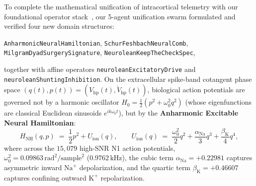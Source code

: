 \documentclass[11pt,letterpaper]{article}
\newcommand{\lean}[1]{\nolinkurl{#1}}
\theoremstyle{definition}
\begin{document}
To complete the mathematical unification of intracortical telemetry with our foundational operator stack~\cite{solidsf_pixelean2026,solidsf_milgram2026,solidsf_reality_comb2026,solidsf_halting2026,solidsf_doomed2026,solidsf_lecun2026}, our 5-agent unification swarm formulated and verified four new domain structures:
\begin{center}
\footnotesize
\lean{AnharmonicNeuralHamiltonian}, \quad \lean{SchurFeshbachNeuralComb},\\
\lean{MilgramDyadSurgerySignature}, \quad \lean{NeuroleanKeepTheCheckSpec},
\end{center}
together with affine operators \lean{neuroleanExcitatoryDrive} and \lean{neuroleanShuntingInhibition}. On the extracellular spike-band cotangent phase space $(q(t), p(t)) = (V_{\mathrm{hp}}(t), \dot{V}_{\mathrm{hp}}(t))$, biological action potentials are governed not by a harmonic oscillator $H_0 = \frac{1}{2}(p^2 + \omega_0^2 q^2)$ (whose eigenfunctions are classical Euclidean sinusoids $e^{ik\omega_0 t}$), but by the \textbf{Anharmonic Excitable Neural Hamiltonian}:
\begin{equation}\label{eq:anharmonic_nhf}
  H_{\mathrm{NH}}(q, p) \;=\; \frac{1}{2}p^2 + U_{\mathrm{ion}}(q), \qquad
  U_{\mathrm{ion}}(q) \;=\; \frac{\omega_0^2}{2}q^2 + \frac{\alpha_{\mathrm{Na}}}{3}q^3 + \frac{\beta_{\mathrm{K}}}{4}q^4,
\end{equation}
where across the $15{,}079$ high-SNR N1 action potentials, $\omega_0^2 = 0.09863\,\text{rad}^2/\text{sample}^2$ ($0.9762\,\text{kHz}$), the cubic term $\alpha_{\mathrm{Na}} = +0.22981$ captures asymmetric inward $\text{Na}^+$ depolarization, and the quartic term $\beta_{\mathrm{K}} = +0.46607$ captures confining outward $\text{K}^+$ repolarization.
\end{document}

